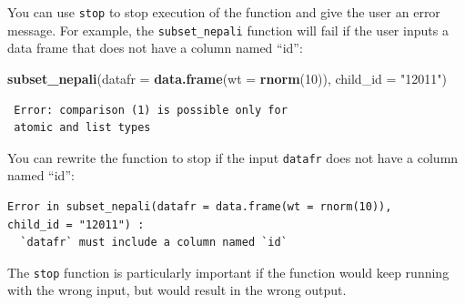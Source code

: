 \documentclass[]{book}
\makeatletter
\newenvironment{Shaded}{\begin{snugshade}}{\end{snugshade}}
\newcommand{\KeywordTok}[1]{\textcolor[rgb]{0.13,0.29,0.53}{\textbf{{#1}}}}
\newcommand{\DataTypeTok}[1]{\textcolor[rgb]{0.13,0.29,0.53}{{#1}}}
\newcommand{\DecValTok}[1]{\textcolor[rgb]{0.00,0.00,0.81}{{#1}}}
\newcommand{\StringTok}[1]{\textcolor[rgb]{0.31,0.60,0.02}{{#1}}}
\newcommand{\NormalTok}[1]{{#1}}
\newenvironment{kframe}{%
\medskip{}
\setlength{\fboxsep}{.8em}
 \def\at@end@of@kframe{}%
 \ifinner\ifhmode%
  \def\at@end@of@kframe{\end{minipage}}%
  \begin{minipage}{\columnwidth}%
 \fi\fi%
 \def\FrameCommand##1{\hskip\@totalleftmargin \hskip-\fboxsep
 \colorbox{shadecolor}{##1}\hskip-\fboxsep
     \hskip-\linewidth \hskip-\@totalleftmargin \hskip\columnwidth}%
 \MakeFramed {\advance\hsize-\width
   \@totalleftmargin\z@ \linewidth\hsize
   \@setminipage}}%
 {\par\unskip\endMakeFramed%
 \at@end@of@kframe}
\renewenvironment{Shaded}{\begin{kframe}}{\end{kframe}}
\makeatother
\begin{document}
You can use \texttt{stop} to stop execution of the function and give the
user an error message. For example, the \texttt{subset\_nepali} function
will fail if the user inputs a data frame that does not have a column
named ``id'':

\begin{Shaded}
\begin{Highlighting}[]
\KeywordTok{subset_nepali}\NormalTok{(}\DataTypeTok{datafr =} \KeywordTok{data.frame}\NormalTok{(}\DataTypeTok{wt =} \KeywordTok{rnorm}\NormalTok{(}\DecValTok{10}\NormalTok{)),}
              \DataTypeTok{child_id =} \StringTok{"12011"}\NormalTok{)}
\end{Highlighting}
\end{Shaded}

\begin{verbatim}
 Error: comparison (1) is possible only for 
 atomic and list types 
\end{verbatim}

You can rewrite the function to stop if the input \texttt{datafr} does
not have a column named ``id'':

\begin{Shaded}
\end{Shaded}

\begin{verbatim}
Error in subset_nepali(datafr = data.frame(wt = rnorm(10)),
child_id = "12011") : 
  `datafr` must include a column named `id`
\end{verbatim}

The \texttt{stop} function is particularly important if the function
would keep running with the wrong input, but would result in the wrong
output. \bigskip
\end{document}
